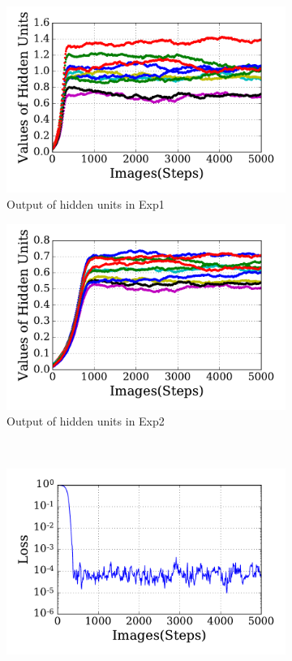 \begin{figure}
\begin{subfigure}[t]{0.45\textwidth}
		\includegraphics[width=\textwidth]{pics_sdlm/30_exp_RBM/exp1_hid_non.pdf}
		\caption{Output of hidden units in Exp1}
	\end{subfigure}
	\begin{subfigure}[t]{0.45\textwidth}
		\includegraphics[width=\textwidth]{pics_sdlm/30_exp_RBM/exp2_hid_non.pdf}
		\caption{Output of hidden units in Exp2}
	\end{subfigure}\\
	\begin{subfigure}[t]{0.45\textwidth}
		\includegraphics[width=\textwidth]{pics_sdlm/30_exp_RBM/exp1_loss.pdf}

\end{subfigure}
\end{figure}
